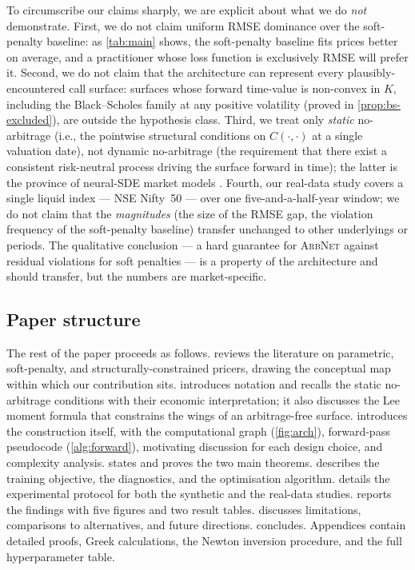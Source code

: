 \documentclass[largeformat]{interact}
\let\cite\citep   %
\theoremstyle{plain}
\theoremstyle{definition}
\newcommand{\arbnet}{\textsc{ArbNet}}
\newcommand{\bs}{Black--Scholes}
\begin{document}
To circumscribe our claims sharply, we are explicit about what we do \emph{not} demonstrate. First, we do not claim uniform RMSE dominance over the soft-penalty baseline: as \cref{tab:main} shows, the soft-penalty baseline fits prices better on average, and a practitioner whose loss function is exclusively RMSE will prefer it. Second, we do not claim that the architecture can represent every plausibly-encountered call surface: surfaces whose forward time-value is non-convex in $K$, including the \bs{} family at any positive volatility (proved in \cref{prop:bs-excluded}), are outside the hypothesis class. Third, we treat only \emph{static} no-arbitrage (i.e., the pointwise structural conditions on $C(\cdot, \cdot)$ at a single valuation date), not dynamic no-arbitrage (the requirement that there exist a consistent risk-neutral process driving the surface forward in time); the latter is the province of neural-SDE market models \cite{cohen2023arbitrage,cuchiero2020generative,gambara2021consistent}. Fourth, our real-data study covers a single liquid index --- NSE Nifty~50 --- over one five-and-a-half-year window; we do not claim that the \emph{magnitudes} (the size of the RMSE gap, the violation frequency of the soft-penalty baseline) transfer unchanged to other underlyings or periods. The qualitative conclusion --- a hard guarantee for \arbnet{} against residual violations for soft penalties --- is a property of the architecture and should transfer, but the numbers are market-specific.

\subsection{Paper structure}

The rest of the paper proceeds as follows.  reviews the literature on parametric, soft-penalty, and structurally-constrained pricers, drawing the conceptual map within which our contribution sits.  introduces notation and recalls the static no-arbitrage conditions with their economic interpretation; it also discusses the Lee moment formula \cite{lee2004moment,lee2005implied} that constrains the wings of an arbitrage-free surface.  introduces the construction itself, with the computational graph (\cref{fig:arch}), forward-pass pseudocode (\cref{alg:forward}), motivating discussion for each design choice, and complexity analysis.  states and proves the two main theorems.  describes the training objective, the diagnostics, and the optimisation algorithm.  details the experimental protocol for both the synthetic and the real-data studies.  reports the findings with five figures and two result tables.  discusses limitations, comparisons to alternatives, and future directions.  concludes. Appendices contain detailed proofs, Greek calculations, the Newton inversion procedure, and the full hyperparameter table.
\end{document}
